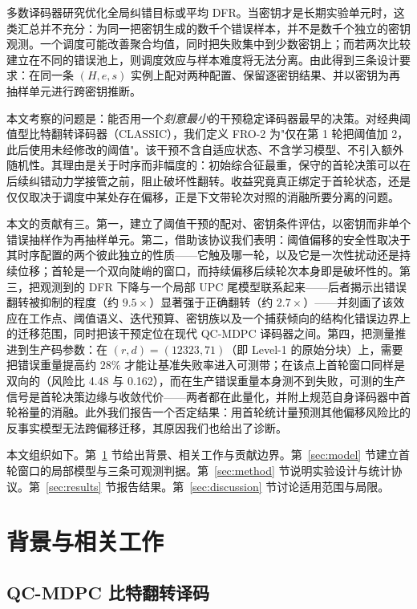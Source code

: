 \documentclass[UTF8,a4paper,10pt,twocolumn]{ctexart}
\begin{document}
多数译码器研究优化全局纠错目标或平均 DFR。当密钥才是长期实验单元时，这类汇总并不充分：为同一把密钥生成的数千个错误样本，并不是数千个独立的密钥观测。一个调度可能改善聚合均值，同时把失败集中到少数密钥上；而若两次比较建立在不同的错误池上，则调度效应与样本难度将无法分离。由此得到三条设计要求：在同一条 $(H,e,s)$ 实例上配对两种配置、保留逐密钥结果、并以密钥为再抽样单元进行跨密钥推断。

本文考察的问题是：能否用一个\emph{刻意最小}的干预稳定译码器最早的决策。对经典阈值型比特翻转译码器（CLASSIC），我们定义 FRO-2 为"仅在第 1 轮把阈值加 2，此后使用未经修改的阈值"。该干预不含自适应状态、不含学习模型、不引入额外随机性。其理由是关于时序而非幅度的：初始综合征最重，保守的首轮决策可以在后续纠错动力学接管之前，阻止破坏性翻转。收益究竟真正绑定于首轮状态，还是仅仅取决于调度中某处存在偏移，正是下文带轮次对照的消融所要分离的问题。

本文的贡献有三。第一，建立了阈值干预的配对、密钥条件评估，以密钥而非单个错误抽样作为再抽样单元。第二，借助该协议我们表明：阈值偏移的安全性取决于其时序配置的两个彼此独立的性质——它触及哪一轮，以及它是一次性扰动还是持续位移；首轮是一个双向陡峭的窗口，而持续偏移后续轮次本身即是破坏性的。第三，把观测到的 DFR 下降与一个局部 UPC 尾模型联系起来——后者揭示出错误翻转被抑制的程度（约 $9.5\times$）显著强于正确翻转（约 $2.7\times$）——并刻画了该效应在工作点、阈值语义、迭代预算、密钥族以及一个捕获倾向的结构化错误边界上的迁移范围，同时把该干预定位在现代 QC-MDPC 译码器之间。第四，把测量推进到生产码参数：在 $(r,d)=(12323,71)$（即 Level-1 的原始分块）上，需要把错误重量提高约 $28\%$ 才能让基准失败率进入可测带；在该点上首轮窗口同样是双向的（风险比 4.48 与 0.162），而在生产错误重量本身测不到失败，可测的生产信号是首轮决策边缘与收敛代价——两者都在此量化，并附上规范自身译码器中首轮裕量的消融。此外我们报告一个否定结果：用首轮统计量预测其他偏移风险比的反事实模型无法跨偏移迁移，其原因我们也给出了诊断。

本文组织如下。第~\ref{sec:background} 节给出背景、相关工作与贡献边界。第~\ref{sec:model} 节建立首轮窗口的局部模型与三条可观测判据。第~\ref{sec:method} 节说明实验设计与统计协议。第~\ref{sec:results} 节报告结果。第~\ref{sec:discussion} 节讨论适用范围与局限。

\section{背景与相关工作}\label{sec:background}

\subsection{QC-MDPC 比特翻转译码}
\end{document}
